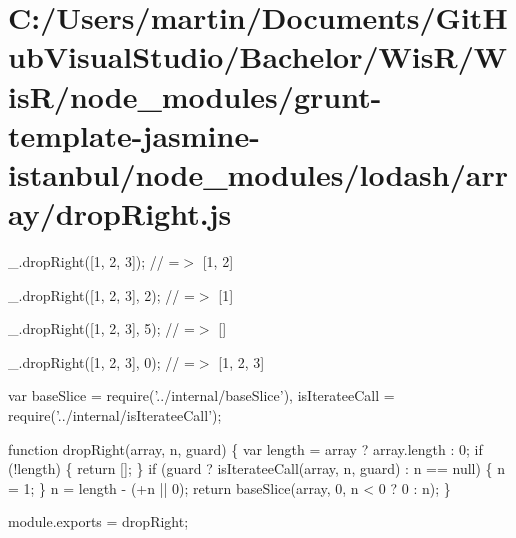 \hypertarget{_c_1_2_users_2martin_2_documents_2_git_hub_visual_studio_2_bachelor_2_wis_r_2_wis_r_2node_module5561efd558d4cdc66a1a337a8684db8d}{}\section{C\+:/\+Users/martin/\+Documents/\+Git\+Hub\+Visual\+Studio/\+Bachelor/\+Wis\+R/\+Wis\+R/node\+\_\+modules/grunt-\/template-\/jasmine-\/istanbul/node\+\_\+modules/lodash/array/drop\+Right.\+js}
\+\_\+.\+drop\+Right(\mbox{[}1, 2, 3\mbox{]}); // =$>$ \mbox{[}1, 2\mbox{]}

\+\_\+.\+drop\+Right(\mbox{[}1, 2, 3\mbox{]}, 2); // =$>$ \mbox{[}1\mbox{]}

\+\_\+.\+drop\+Right(\mbox{[}1, 2, 3\mbox{]}, 5); // =$>$ \mbox{[}\mbox{]}

\+\_\+.\+drop\+Right(\mbox{[}1, 2, 3\mbox{]}, 0); // =$>$ \mbox{[}1, 2, 3\mbox{]}


\begin{DoxyCodeInclude}
var baseSlice = require(\textcolor{stringliteral}{'../internal/baseSlice'}),
    isIterateeCall = require(\textcolor{stringliteral}{'../internal/isIterateeCall'});

\textcolor{keyword}{function} dropRight(array, n, guard) \{
  var length = array ? array.length : 0;
  \textcolor{keywordflow}{if} (!length) \{
    \textcolor{keywordflow}{return} [];
  \}
  \textcolor{keywordflow}{if} (guard ? isIterateeCall(array, n, guard) : n == null) \{
    n = 1;
  \}
  n = length - (+n || 0);
  \textcolor{keywordflow}{return} baseSlice(array, 0, n < 0 ? 0 : n);
\}

module.exports = dropRight;
\end{DoxyCodeInclude}
 